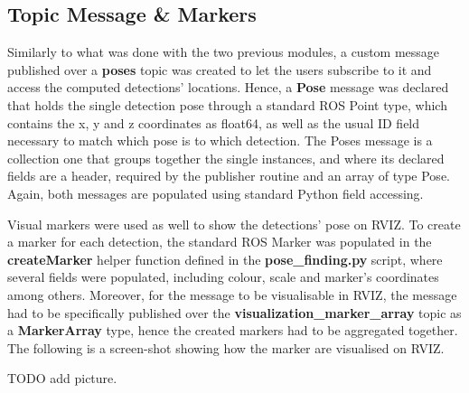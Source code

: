 \subsection{Topic Message \& Markers}

Similarly to what was done with the two previous modules, a custom message published over a \textbf{poses} topic was created to let the users subscribe to it and access the computed detections' locations. Hence, a \textbf{Pose} message was declared that holds the single detection pose through a standard ROS Point type, which contains the x, y and z coordinates as float64, as well as the usual ID field necessary to match which pose is to which detection. The Poses message is a collection one that groups together the single instances, and where its declared fields are a header, required by the publisher routine and an array of type Pose. Again, both messages are populated using standard Python field accessing.

Visual markers were used as well to show the detections' pose on RVIZ. To create a marker for each detection, the standard ROS Marker was populated in the \textbf{createMarker} helper function defined in the \textbf{pose\_finding.py} script, where several fields were populated, including colour, scale and marker's coordinates among others. Moreover, for the message to be visualisable in RVIZ, the message had to be specifically published over the \textbf{visualization\_marker\_array} topic as a \textbf{MarkerArray} type, hence the created markers had to be aggregated together. The following is a screen-shot showing how the marker are visualised on RVIZ.

TODO add picture.
\clearpage



